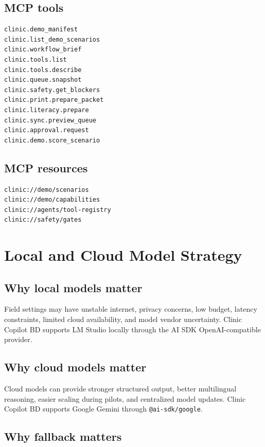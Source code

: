 \documentclass[11pt,letterpaper]{article}
\begin{document}
\subsection{MCP tools}

\begin{verbatim}
clinic.demo_manifest
clinic.list_demo_scenarios
clinic.workflow_brief
clinic.tools.list
clinic.tools.describe
clinic.queue.snapshot
clinic.safety.get_blockers
clinic.print.prepare_packet
clinic.literacy.prepare
clinic.sync.preview_queue
clinic.approval.request
clinic.demo.score_scenario
\end{verbatim}

\subsection{MCP resources}

\begin{verbatim}
clinic://demo/scenarios
clinic://demo/capabilities
clinic://agents/tool-registry
clinic://safety/gates
\end{verbatim}

\section{Local and Cloud Model Strategy}

\subsection{Why local models matter}

Field settings may have unstable internet, privacy concerns, low budget, latency constraints, limited cloud availability, and model vendor uncertainty. Clinic Copilot BD supports LM Studio locally through the AI SDK OpenAI-compatible provider.

\subsection{Why cloud models matter}

Cloud models can provide stronger structured output, better multilingual reasoning, easier scaling during pilots, and centralized model updates. Clinic Copilot BD supports Google Gemini through \texttt{@ai-sdk/google}.

\subsection{Why fallback matters}
\end{document}
